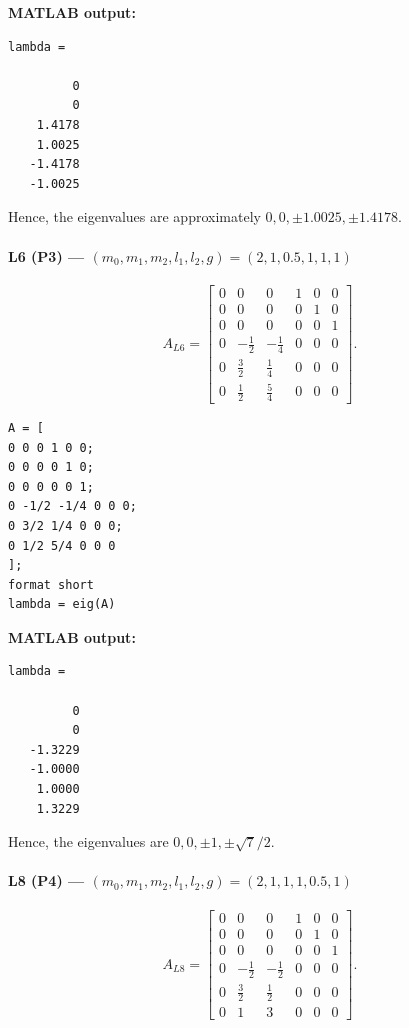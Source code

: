 \documentclass[12pt,a4paper]{article}
\begin{document}
\textbf{MATLAB output:}
\begin{lstlisting}[language={}]
lambda =

         0
         0
    1.4178
    1.0025
   -1.4178
   -1.0025
\end{lstlisting}
Hence, the eigenvalues are approximately $0,0,\pm1.0025,\pm1.4178$.

\vspace{0.3cm}

\Needspace{2cm}
\paragraph*{L6 (P3) --- $(m_0,m_1,m_2,l_1,l_2,g)=(2,1,0.5,1,1,1)$}

\[
A_{L6}=\begin{bmatrix}
0 & 0 & 0 & 1 & 0 & 0 \\
0 & 0 & 0 & 0 & 1 & 0 \\
0 & 0 & 0 & 0 & 0 & 1 \\
0 & -\frac{1}{2} & -\frac{1}{4} & 0 & 0 & 0 \\
0 & \frac{3}{2} & \frac{1}{4} & 0 & 0 & 0 \\
0 & \frac{1}{2} & \frac{5}{4} & 0 & 0 & 0
\end{bmatrix}.
\]

\begin{lstlisting}
A = [
0 0 0 1 0 0;
0 0 0 0 1 0;
0 0 0 0 0 1;
0 -1/2 -1/4 0 0 0;
0 3/2 1/4 0 0 0;
0 1/2 5/4 0 0 0
];
format short
lambda = eig(A)
\end{lstlisting}

\textbf{MATLAB output:}
\begin{lstlisting}[language={}]
lambda =

         0
         0
   -1.3229
   -1.0000
    1.0000
    1.3229
\end{lstlisting}
Hence, the eigenvalues are $0,0,\pm1,\pm\sqrt{7}/2$.

\vspace{0.3cm}

\Needspace{2cm}
\paragraph*{L8 (P4) --- $(m_0,m_1,m_2,l_1,l_2,g)=(2,1,1,1,0.5,1)$}

\[
A_{L8}=\begin{bmatrix}
0 & 0 & 0 & 1 & 0 & 0 \\
0 & 0 & 0 & 0 & 1 & 0 \\
0 & 0 & 0 & 0 & 0 & 1 \\
0 & -\frac{1}{2} & -\frac{1}{2} & 0 & 0 & 0 \\
0 & \frac{3}{2} & \frac{1}{2} & 0 & 0 & 0 \\
0 & 1 & 3 & 0 & 0 & 0
\end{bmatrix}.
\]
\end{document}
